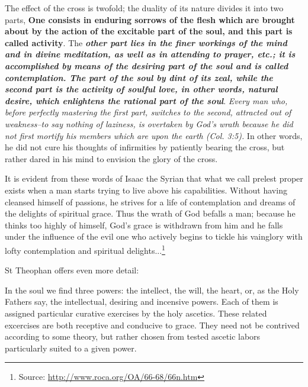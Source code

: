 \begin{quotex}
The effect of the cross is twofold; the duality of its nature divides it into two parts, \textbf{One consists in enduring sorrows of the flesh which are brought about by the action of the excitable part of the soul, and this part is called activity}. The \emph{\textbf{other part lies in the finer workings of the mind and in divine meditation, as well as in attending to prayer, etc.; it is accomplished by means of the desiring part of the soul and is called contemplation. The part of the soul by dint of its zeal, while the second part is the activity of soulful love, in other words, natural desire, which enlightens the rational part of the soul}}. \emph{Every man who, before perfectly mastering the first part, switches to the second, attracted out of weakness--to say nothing of laziness, is overtaken by God's wrath because he did not first mortify his members which are upon the earth (Col. 3:5).} In other words, he did not cure his thoughts of infirmities by patiently bearing the cross, but rather dared in his mind to envision the glory of the cross. 
\end{quotex}


\begin{quotex}
It is evident from these words of Isaac the Syrian that what we call prelest proper exists when a man starts trying to live above his capabilities. Without having cleansed himself of passions, he strives for a life of contemplation and dreams of the delights of spiritual grace. Thus the wrath of God befalls a man; because he thinks too highly of himself, God's grace is withdrawn from him and he falls under the influence of the evil one who actively begins to tickle his vainglory with lofty contemplation and spiritual delights...\footnote{Source: \url{http://www.roca.org/OA/66-68/66n.htm}}
\end{quotex}

St Theophan offers even more detail:

\begin{quotex}
In the soul we find three powers: the intellect, the will, the heart, or, as the Holy Fathers say, the intellectual, desiring and incensive powers. Each of them is assigned particular curative exercises by the holy ascetics. These related excercises are both receptive and conducive to grace. They need not be contrived according to some theory, but rather chosen from tested ascetic labors particularly suited to a given power.
\end{quotex}

